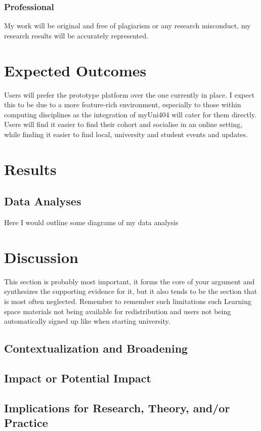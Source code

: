 \documentclass[lettersize,journal]{IEEEtran}
\begin{document}
	\subsubsection{Professional}
	My work will be original and free of plagiarism or any research misconduct, my research results will be accurately represented.

\section{Expected Outcomes}


 Users will prefer the prototype platform over the one currently in place. I expect this to be due to a more
 feature-rich environment, 
 especially to those within computing disciplines as the integration of myUni404 will cater for them directly. Users will find it easier to find their 
 cohort and socialise in an online setting, while finding it easier to find local, university and student events and updates.

\section{Results}
\subsection{Data Analyses}
Here I would outline some diagrams of my data analysis

\section{Discussion}

This section is probably most important, it forms the core of your argument and synthesizes the supporting evidence for it, but it also tends to be the section that is most often neglected. Remember to remember such limitations such Learning space materials not being available for redistribution and users not being automatically signed up like when starting university.

\subsection{Contextualization and Broadening}
\subsection{Impact or Potential Impact}
\subsection{Implications for Research, Theory, and/or Practice}
\end{document}
